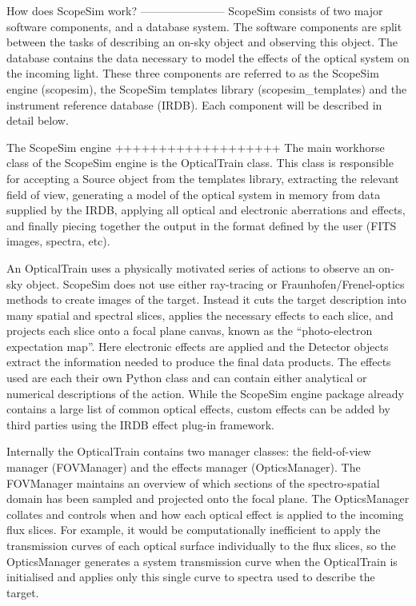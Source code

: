 How does ScopeSim work?
-----------------------
ScopeSim consists of two major software components, and a database system. The
software components are split between the tasks of describing an on-sky object
and observing this object. The database contains the data necessary to model the
effects of the optical system on the incoming light. These three components are
referred to as the ScopeSim engine (scopesim), the ScopeSim templates library
(scopesim_templates) and the instrument reference database (IRDB). Each
component will be described in detail below.

The ScopeSim engine
+++++++++++++++++++
The main workhorse class of the ScopeSim engine is the OpticalTrain class. This
class is responsible for accepting a Source object from the templates library,
extracting the relevant field of view, generating a model of the optical system
in memory from data supplied by the IRDB, applying all optical and electronic
aberrations and effects, and finally piecing together the output in the format
defined by the user (FITS images, spectra, etc).

An OpticalTrain uses a physically motivated series of actions to observe an
on-sky object. ScopeSim does not use either ray-tracing or
Fraunhofen/Frenel-optics methods to create images of the target. Instead it
cuts the target description into many spatial and spectral slices, applies the
necessary effects to each slice, and projects each slice onto a focal plane
canvas, known as the ``photo-electron expectation map''. Here electronic
effects are applied and the Detector objects extract the information needed to
produce the final data products. The effects used are each their own Python
class and can contain either analytical or numerical descriptions of the action.
While the ScopeSim engine package already contains a large list of common
optical effects, custom effects can be added by third parties using the
IRDB effect plug-in framework.

Internally the OpticalTrain contains two manager classes: the field-of-view
manager (FOVManager) and the effects manager (OpticsManager). The FOVManager
maintains an overview of which sections of the spectro-spatial domain has been
sampled and projected onto the focal plane. The OpticsManager collates and
controls when and how each optical effect is applied to the incoming flux
slices. For example, it would be computationally inefficient to apply the
transmission curves of each optical surface individually to the flux slices, so
the OpticsManager generates a system transmission curve when the OpticalTrain is
initialised and applies only this single curve to spectra used to describe the
target.


